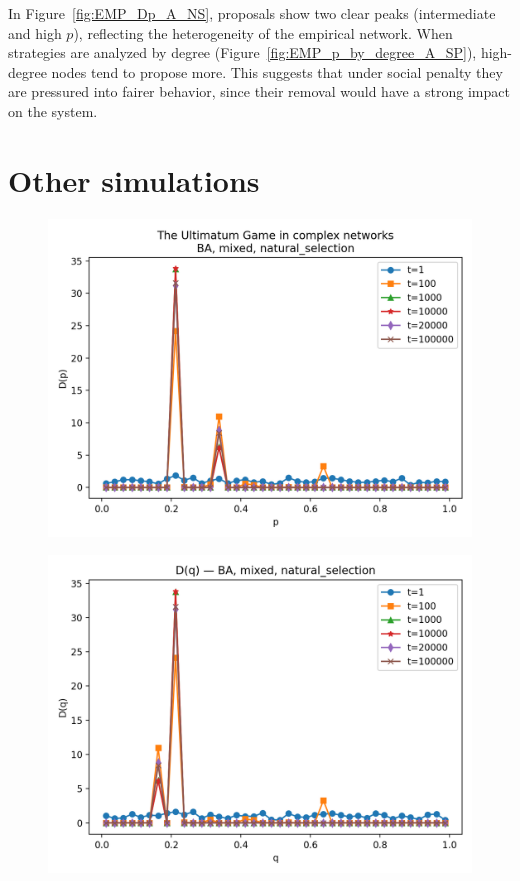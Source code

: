 In Figure~\ref{fig:EMP_Dp_A_NS}, proposals show two clear peaks (intermediate
and high $p$), reflecting the heterogeneity of the empirical network.  
When strategies are analyzed by degree (Figure~\ref{fig:EMP_p_by_degree_A_SP}),
high-degree nodes tend to propose more. This suggests that under social penalty
they are pressured into fairer behavior, since their removal would have a strong
impact on the system.

\section{Other simulations}

\begin{figure}[h!]
    \centering
    \setlength{\tabcolsep}{2pt}
    \begin{minipage}[t]{0.48\textwidth}
        \centering
        \includegraphics[width=\textwidth]{images/TASK1/Dp_BA_MIX_natural_selection.png}
        \label{fig:Mix_Dp}
    \end{minipage}
    \hfill
    \begin{minipage}[t]{0.48\textwidth}
        \centering
        \includegraphics[width=\textwidth]{images/TASK1/Dq_BA_MIX_natural_selection.png}

\end{minipage}
\end{figure}
